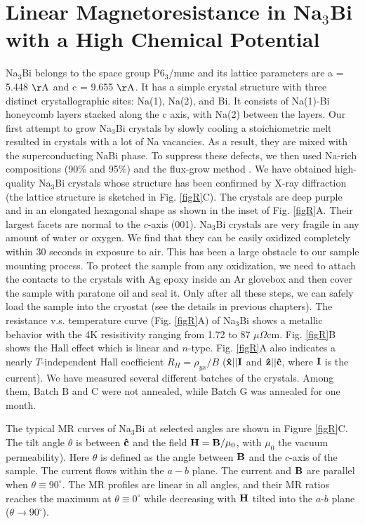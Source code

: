\section{Linear Magnetoresistance in Na$_3$Bi with a High Chemical Potential}
\label{sec:na3bi:lmr}


Na$_3$Bi belongs to the space group P6$_3$/mmc and its lattice parameters are a = 5.448 $\rm{\AA}$ and c = 9.655 $\rm{\AA}$. It has a simple crystal structure with three distinct crystallographic sites: Na(1), Na(2), and Bi. It consists of Na(1)-Bi honeycomb layers stacked along the c axis, with Na(2) between the layers. Our first attempt to grow Na$_3$Bi crystals by slowly cooling a stoichiometric melt resulted in crystals with a lot of Na vacancies. As a result, they are mixed with the superconducting NaBi phase. To suppress these defects, we then used Na-rich compositions (90$\%$ and 95$\%$) and the flux-grow method \cite{Kushwaha}. We have obtained high-quality Na$_3$Bi crystals whose structure has been confirmed by X-ray diffraction (the lattice structure is sketched in Fig. \ref{figR}C). The crystals are deep purple and in an elongated hexagonal shape as shown in the inset of Fig. \ref{figR}A. Their largest facets are normal to the $c$-axis (001). Na$_3$Bi crystals are very fragile in any amount of water or oxygen. We find that they can be easily oxidized completely within 30 seconds in exposure to air. This has been a large obstacle to our sample mounting process. To protect the sample from any oxidization, we need to attach the contacts to the crystals with Ag epoxy inside an Ar glovebox and then cover the sample with paratone oil and seal it. Only after all these steps, we can safely load the sample into the cryostat (see the details in previous chapters). The resistance v.s. temperature curve (Fig. \ref{figR}A) of Na$_3$Bi shows a metallic behavior with the 4K resisitivity ranging from 1.72 to 87 $\mu\Omega$cm. Fig. \ref{figR}B shows the Hall effect which is linear and $n$-type. Fig. \ref{figR}A also indicates a nearly $T$-independent Hall coefficient $R_H = \rho_{yx}/B$ ($\bf\hat{x}||I$ and $\bf\hat{z}||\hat{c}$, where $\bf I$ is the current). We have measured several different batches of the crystals. Among them, Batch B and C were not annealed, while Batch G was annealed for one month. 

The typical MR curves of Na$_3$Bi at selected angles are shown in Figure \ref{figR}C. The tilt angle $\theta$ is between $\bf\hat{c}$ and the field ${\bf H}={\bf B}/\mu_0$, with $\mu_0$ the vacuum permeability). Here $\theta$ is defined as the angle between $\bf B$ and the $c$-axis of the sample. The current flows within the $a-b$ plane. The current and $\bf B$ are parallel when $\theta \equiv 90^\circ$. The MR profiles are linear in all angles, and their MR ratios reaches the maximum at $\theta \equiv 0^\circ$ while decreasing with $\bf H$ tilted into the $a$-$b$ plane ($\theta\to 90^\circ$). 

